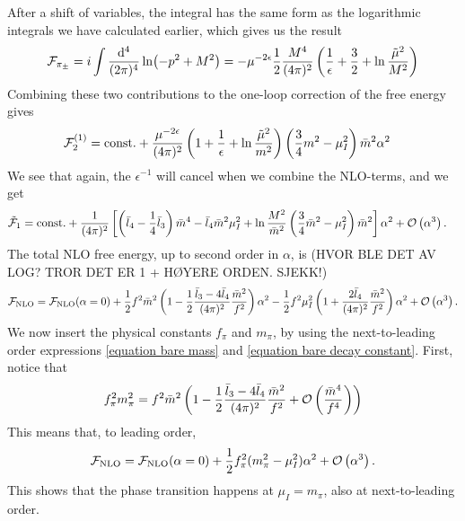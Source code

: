 After a shift of variables, the integral has the same form as the logarithmic integrals we have calculated earlier, which gives us the result
\begin{equation}
    \Ef_{\pi_\pm}
    = i \int \frac{\dd^4}{(2\pi)^4}
    \ln(-p^2 + M^2)
    = 
    - \mu^{-2\epsilon}\frac{1}{2} \frac{M^4}{(4 \pi)^2}
    \left(\frac{1}{\epsilon} + \frac{3}{2} + \ln \frac{\tilde \mu^2}{M^2}\right)
\end{equation}
Combining these two contributions to the one-loop correction of the free energy gives
\begin{align*}
    \Ef_2^{(1)}
    &=
    \mathrm{const.}
    +
    \frac{\mu^{-2 \epsilon } }{(4 \pi)^2} 
    \left(1 + \frac{1}{\epsilon} + \ln \frac{\tilde \mu^2}{m^2}\right)
    \left(\frac{3}{4}m^2 - \mu_I^2\right)
    \bar m^2 \alpha^2
\end{align*}
We see that again, the $\epsilon^{-1}$ will cancel when we combine the NLO-terms, and we get
\begin{align}
    \tilde \Ef_1
    & = 
    \const+ 
    \frac{1}{(4\pi)^2}
    \left[
        \left(
            \bar l_4 - \frac{1}{4}\bar l_3
        \right)\bar m^4
        -\bar l_4\bar m^2\mu_I^2
        + \ln\frac{M^2}{\bar m^2}
        \left(\frac{3}{4}\bar m^2 - \mu_I^2\right)\bar m^2
    \right]\alpha^2
    + \Oh[3]{\alpha}.
\end{align}
The total NLO free energy, up to second order in $\alpha$, is
(HVOR BLE DET AV LOG? TROR DET ER 1 + HØYERE ORDEN. SJEKK!)
\begin{equation}
    \Ef_{\mathrm{NLO}}
    =
    \Ef_{\mathrm{NLO}}(\alpha = 0)
    +
    \frac{1}{2} f^2 \bar m^2
    \left(
        1
        -
        \frac{1}{2}
        \frac{\bar l_3 - 4 \bar l_4}{(4 \pi)^2} \frac{\bar m^2}{f^2}
    \right)\alpha^2
    - \frac{1}{2}f^2 \mu_I^2
    \left(
        1
        +
        \frac{2 \bar l_4}{(4 \pi)^2}
        \frac{\bar m^2}{f^2}
    \right) \alpha^2
    + \Oh[3]{\alpha}.
\end{equation}
We now insert the physical constants $f_\pi$ and $m_\pi$, by using the next-to-leading order expressions \cref{equation bare mass} and \cref{equation bare decay constant}.
First, notice that
\begin{equation}
    f_\pi^2 m_\pi^2
    = f^2 \bar m^2
    \left(
        1 - \frac{1}{2} \frac{\bar l_3 - 4 \bar l_4}{(4 \pi)^2} \frac{\bar m^2}{f^2}
        +
        \Oh[]{\frac{\bar m^4}{f^4}}
    \right)
\end{equation}
This means that, to leading order,
\begin{equation}
    \Ef_{\mathrm{NLO}}
    =
    \Ef_{\mathrm{NLO}}(\alpha = 0)
    + \frac{1}{2}f_\pi^2 (m_\pi^2 - \mu_I^2 )\alpha^2
    + \Oh[3]{\alpha}.
\end{equation}
This shows that the phase transition happens at $\mu_I = m_\pi$, also at next-to-leading order.
